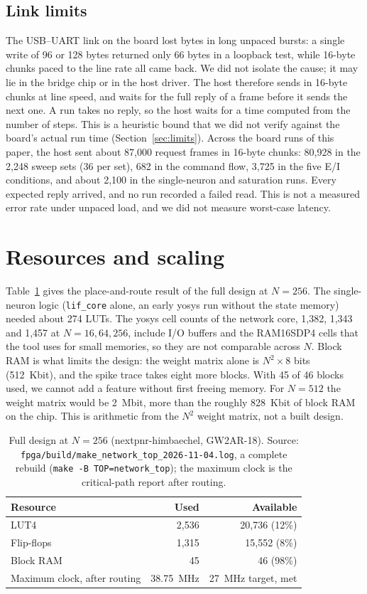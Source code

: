 \documentclass[11pt]{article}
\begin{document}
\subsection{Link limits}
The USB--UART link on the board lost bytes in long unpaced bursts: a single write of 96 or 128 bytes returned only 66 bytes in a loopback test, while 16-byte chunks paced to the line rate all came back.
We did not isolate the cause; it may lie in the bridge chip or in the host driver.
The host therefore sends in 16-byte chunks at line speed, and waits for the full reply of a frame before it sends the next one.
A run takes no reply, so the host waits for a time computed from the number of steps. This is a heuristic bound that we did not verify against the board's actual run time (Section~\ref{sec:limits}). Across the board runs of this paper, the host sent about 87,000 request frames in 16-byte chunks: 80,928 in the 2,248 sweep sets (36 per set), 682 in the command flow, 3,725 in the five E/I conditions, and about 2,100 in the single-neuron and saturation runs. Every expected reply arrived, and no run recorded a failed read. This is not a measured error rate under unpaced load, and we did not measure worst-case latency.

\section{Resources and scaling}
\label{sec:resources}
Table~\ref{tab:res} gives the place-and-route result of the full design at $N=256$.
The single-neuron logic (\texttt{lif\_core} alone, an early yosys run without the state memory) needed about 274 LUTs.
The yosys cell counts of the network core, 1,382, 1,343 and 1,457 at $N=16, 64, 256$, include I/O buffers and the RAM16SDP4 cells that the tool uses for small memories, so they are not comparable across $N$.
Block RAM is what limits the design: the weight matrix alone is $N^2 \times 8$ bits (512~Kbit), and the spike trace takes eight more blocks. With 45 of 46 blocks used, we cannot add a feature without first freeing memory.
For $N=512$ the weight matrix would be 2~Mbit, more than the roughly 828~Kbit of block RAM on the chip. This is arithmetic from the $N^2$ weight matrix, not a built design.

\begin{table}[t]
\centering
\caption{Full design at $N=256$ (nextpnr-himbaechel, GW2AR-18). Source: \texttt{fpga/build/\allowbreak make\_network\allowbreak\_top\allowbreak\_2026-11-04.log}, a complete rebuild (\texttt{make -B TOP=network\_top}); the maximum clock is the critical-path report after routing.}
\label{tab:res}
\setlength{\tabcolsep}{9pt}
\begin{tabular}{lrr}
\toprule
Resource & Used & Available \\
\midrule
LUT4 & 2,536 & 20,736 (12\%) \\
Flip-flops & 1,315 & 15,552 (8\%) \\
Block RAM & 45 & 46 (98\%) \\
Maximum clock, after routing & 38.75~MHz & 27~MHz target, met \\
\bottomrule
\end{tabular}
\end{table}
\end{document}
